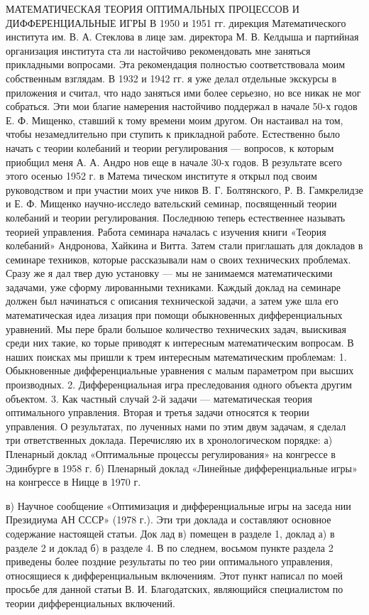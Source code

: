\documentclass[10pt]{article}
\begin{document}
МАТЕМАТИЧЕСКАЯ ТЕОРИЯ ОПТИМАЛЬНЫХ ПРОЦЕССОВ
И ДИФФЕРЕНЦИАЛЬНЫЕ ИГРЫ
В 1950 и 1951 гг. дирекция Математического института им. В. А. Стеклова
в лице зам. директора М. В. Келдыша и партийная организация института ста­
ли настойчиво рекомендовать мне заняться прикладными вопросами. Эта
рекомендация полностью соответствовала моим собственным взглядам. В 1932
и 1942 гг. я уже делал отдельные экскурсы в приложения и считал, что надо
заняться ими более серьезно, но все никак не мог собраться. Эти мои благие
намерения настойчиво поддержал в начале 50-х годов Е. Ф. Мищенко, ставший
к тому времени моим другом. Он настаивал на том, чтобы незамедлительно при­
ступить к прикладной работе. Естественно было начать с теории колебаний
и теории регулирования — вопросов, к которым приобщил меня А. А. Андро­
нов еще в начале 30-х годов. В результате всего этого осенью 1952 г. в Матема­
тическом институте я открыл под своим руководством и при участии моих уче­
ников В. Г. Болтянского, Р. В. Гамкрелидзе и Е. Ф. Мищенко научно-исследо­
вательский семинар, посвященный теории колебаний и теории регулирования.
Последнюю теперь естественнее называть теорией управления.
Работа семинара началась с изучения книги «Теория колебаний» Андронова,
Хайкина и Витта. Затем стали приглашать для докладов в семинаре техников,
которые рассказывали нам о своих технических проблемах. Сразу же я дал твер­
дую установку — мы не занимаемся математическими задачами, уже сформу­
лированными техниками. Каждый доклад на семинаре должен был начинаться
с описания технической задачи, а затем уже шла его математическая идеа­
лизация при помощи обыкновенных дифференциальных уравнений. Мы пере­
брали большое количество технических задач, выискивая среди них такие, ко­
торые приводят к интересным математическим вопросам. В наших поисках
мы пришли к трем интересным математическим проблемам:
1. Обыкновенные дифференциальные уравнения с малым параметром
при высших производных.
2. Дифференциальная игра преследования одного объекта другим объектом.
3. Как частный случай 2-й задачи — математическая теория оптимального
управления.
Вторая и третья задачи относятся к теории управления. О результатах, по­
лученных нами по этим двум задачам, я сделал три ответственных доклада.
Перечисляю их в хронологическом порядке:
а) Пленарный доклад «Оптимальные процессы регулирования» на конгрессе
в Эдинбурге в 1958 г.
б) Пленарный доклад «Линейные дифференциальные игры» на конгрессе
в Ницце в 1970 г.

в) Научное сообщение «Оптимизация и дифференциальные игры на заседа­
нии Президиума АН СССР» (1978 г.).
Эти три доклада и составляют основное содержание настоящей статьи. Док­
лад в) помещен в разделе 1, доклад а) в разделе 2 и доклад б) в разделе 4. В по­
следнем, восьмом пункте раздела 2 приведены более поздние результаты по тео­
рии оптимального управления, относящиеся к дифференциальным включениям.
Этот пункт написал по моей просьбе для данной статьи В. И. Благодатских,
являющийся специалистом по теории дифференциальных включений.
\end{document}
